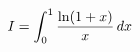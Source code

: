 \documentclass[preview]{standalone}
\begin{document}
\begin{align*}
\special{dvisvgm:raw <g id='unique000'>}I=\int_0^1\frac{\ln(1+x)}x\,dx\special{dvisvgm:raw </g>}
\end{align*}
\end{document}
